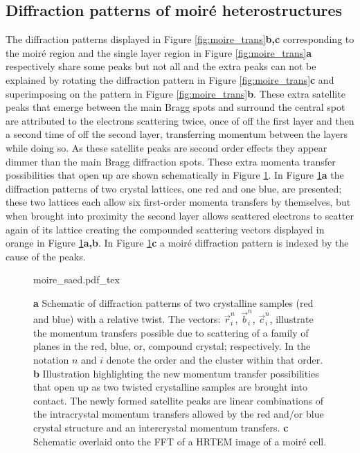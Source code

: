 \subsection{Diffraction patterns of moiré heterostructures}
The diffraction patterns displayed in Figure \ref{fig:moire_trans}\textbf{b,c} corresponding to the moiré region and the single layer region in Figure \ref{fig:moire_trans}\textbf{a} respectively share some peaks but not all and the extra peaks can not be explained by rotating the diffraction pattern in Figure \ref{fig:moire_trans}\textbf{c} and superimposing on the pattern in Figure \ref{fig:moire_trans}\textbf{b}.
These extra satellite peaks that emerge between the main Bragg spots and surround the central spot are attributed to the electrons scattering twice, once of off the first layer and then a second time of off the second layer, transferring momentum between the layers while doing so. As these satellite peaks are second order effects they appear dimmer than the main Bragg diffraction spots.
These extra momenta transfer possibilities that open up are shown schematically in Figure \ref{fig:moire_saed}. In Figure \ref{fig:moire_saed}\textbf{a} the diffraction patterns of two crystal lattices, one red and one blue, are presented; these two lattices each allow six first-order momenta transfers by themselves, but when brought into proximity the second layer allows scattered electrons to scatter again of its lattice creating the compounded scattering vectors displayed in orange in Figure \ref{fig:moire_saed}\textbf{a,b}. In Figure \ref{fig:moire_saed}\textbf{c} a moiré diffraction pattern is indexed by the cause of the peaks.


\begin{figure}[h]
    \centering
    \def\svgwidth{1\linewidth}
    {moire_saed.pdf_tex}
    \caption{\textbf{a} Schematic of diffraction patterns of two crystalline samples (red and blue) with a relative twist. The vectors: $\vec{r}_i^n$, $\vec{b}_i^n$, $\vec{c}_i^n$, illustrate the momentum transfers possible due to scattering of a family of planes in the red, blue, or, compound crystal; respectively. In the notation $n$ and $i$ denote the order and the cluster within that order. \textbf{b} Illustration highlighting the new momentum transfer possibilities that open up as two twisted crystalline samples are brought into contact. The newly formed satellite peaks are linear combinations of the intracrystal momentum transfers allowed by the red and/or blue crystal structure and an intercrystal momentum transfers. \textbf{c} Schematic overlaid onto the FFT of a HRTEM image of a moiré cell.}
    \label{fig:moire_saed}
\end{figure}

\clearpage
